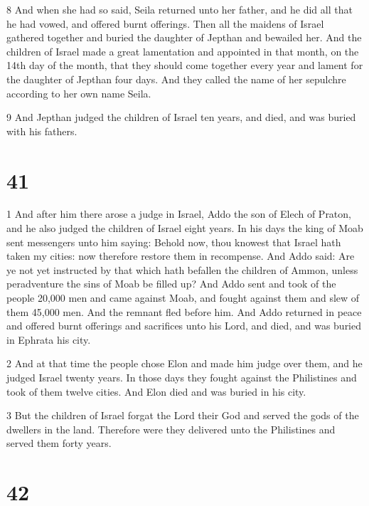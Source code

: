 \par 8 And when she had so said, Seila returned unto her father, and he did all that he had vowed, and offered burnt offerings. Then all the maidens of Israel gathered together and buried the daughter of Jepthan and bewailed her. And the children of Israel made a great lamentation and appointed in that month, on the 14th day of the month, that they should come together every year and lament for the daughter of Jepthan four days. And they called the name of her sepulchre according to her own name Seila.

\par 9 And Jepthan judged the children of Israel ten years, and died, and was buried with his fathers.

\chapter{41}

\par 1 And after him there arose a judge in Israel, Addo the son of Elech of Praton, and he also judged the children of Israel eight years. In his days the king of Moab sent messengers unto him saying: Behold now, thou knowest that Israel hath taken my cities: now therefore restore them in recompense. And Addo said: Are ye not yet instructed by that which hath befallen the children of Ammon, unless peradventure the sins of Moab be filled up? And Addo sent and took of the people 20,000 men and came against Moab, and fought against them and slew of them 45,000 men. And the remnant fled before him. And Addo returned in peace and offered burnt offerings and sacrifices unto his Lord, and died, and was buried in Ephrata his city.

\par 2 And at that time the people chose Elon and made him judge over them, and he judged Israel twenty years. In those days they fought against the Philistines and took of them twelve cities. And Elon died and was buried in his city.

\par 3 But the children of Israel forgat the Lord their God and served the gods of the dwellers in the land. Therefore were they delivered unto the Philistines and served them forty years.

\chapter{42}

